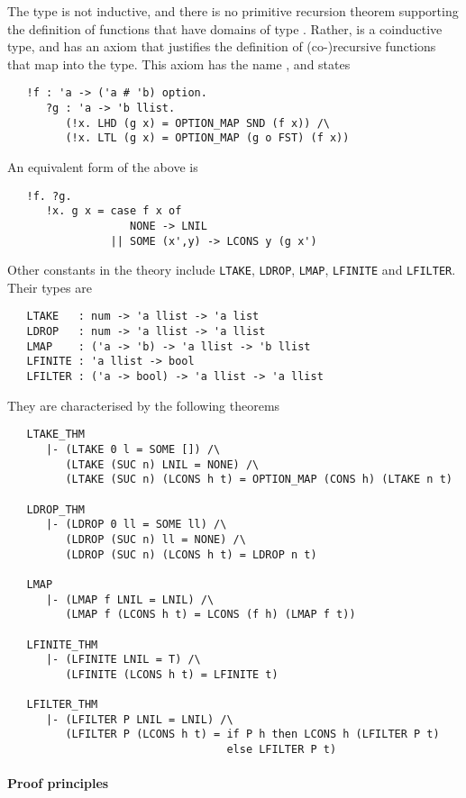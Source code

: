 The type  is not inductive, and there is no primitive
recursion theorem supporting the definition of functions that have
domains of type .  Rather,  is a coinductive type,
and has an axiom that justifies the definition of (co-)recursive
functions that map into the  type.  This axiom has the name
, and states
{\small \begin{verbatim}
   !f : 'a -> ('a # 'b) option.
      ?g : 'a -> 'b llist.
         (!x. LHD (g x) = OPTION_MAP SND (f x)) /\
         (!x. LTL (g x) = OPTION_MAP (g o FST) (f x))
\end{verbatim}}
\noindent An equivalent form of the above is
{\small
\begin{verbatim}
   !f. ?g.
      !x. g x = case f x of
                   NONE -> LNIL
                || SOME (x',y) -> LCONS y (g x')
\end{verbatim}
}

Other constants in the theory  include \texttt{LTAKE},
\texttt{LDROP}, \texttt{LMAP}, \texttt{LFINITE} and
\texttt{LFILTER}. Their types are
{\small \begin{verbatim}
   LTAKE   : num -> 'a llist -> 'a list
   LDROP   : num -> 'a llist -> 'a llist
   LMAP    : ('a -> 'b) -> 'a llist -> 'b llist
   LFINITE : 'a llist -> bool
   LFILTER : ('a -> bool) -> 'a llist -> 'a llist
\end{verbatim}}
\noindent They are characterised by the following theorems
{\small
\begin{verbatim}
   LTAKE_THM
      |- (LTAKE 0 l = SOME []) /\
         (LTAKE (SUC n) LNIL = NONE) /\
         (LTAKE (SUC n) (LCONS h t) = OPTION_MAP (CONS h) (LTAKE n t)

   LDROP_THM
      |- (LDROP 0 ll = SOME ll) /\
         (LDROP (SUC n) ll = NONE) /\
         (LDROP (SUC n) (LCONS h t) = LDROP n t)

   LMAP
      |- (LMAP f LNIL = LNIL) /\
         (LMAP f (LCONS h t) = LCONS (f h) (LMAP f t))

   LFINITE_THM
      |- (LFINITE LNIL = T) /\
         (LFINITE (LCONS h t) = LFINITE t)

   LFILTER_THM
      |- (LFILTER P LNIL = LNIL) /\
         (LFILTER P (LCONS h t) = if P h then LCONS h (LFILTER P t)
                                  else LFILTER P t)
\end{verbatim}
}

\paragraph{Proof principles}

